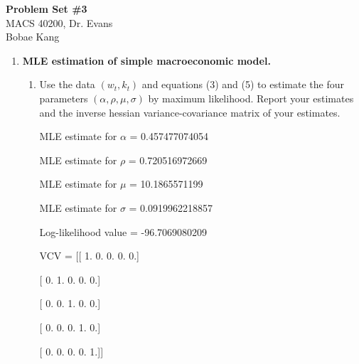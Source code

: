 \documentclass[letterpaper,12pt]{article}
\theoremstyle{definition}
\begin{document}
\begin{flushleft}
  \textbf{\large{Problem Set \#3}} \\
  MACS 40200, Dr. Evans \\
  Bobae Kang
\end{flushleft}

\vspace{5mm}

\begin{enumerate}
\item\textbf{ MLE estimation of simple macroeconomic model.}
\begin{enumerate}
\item Use the data $(w_t, k_t)$ and equations (3) and (5) to estimate the four parameters $(\alpha, \rho, \mu, \sigma)$ by maximum likelihood. Report your estimates and the inverse
hessian variance-covariance matrix of your estimates.
\par\bigskip
MLE estimate for $\alpha$ = 0.457477074054 \par
MLE estimate for $\rho$ = 0.720516972669 \par
MLE estimate for $\mu$ = 10.1865571199 \par
MLE estimate for $\sigma$ = 0.0919962218857 \par
Log-likelihood value = -96.7069080209\par
VCV = [[ 1.  0.  0.  0.  0.] \par
\hspace{12mm}   [ 0.  1.  0.  0.  0.] \par
\hspace{12mm}   [ 0.  0.  1.  0.  0.] \par
\hspace{12mm}   [ 0.  0.  0.  1.  0.] \par
\hspace{12mm}   [ 0.  0.  0.  0.  1.]]
\par\bigskip


\end{enumerate}
\end{enumerate}
\end{document}
